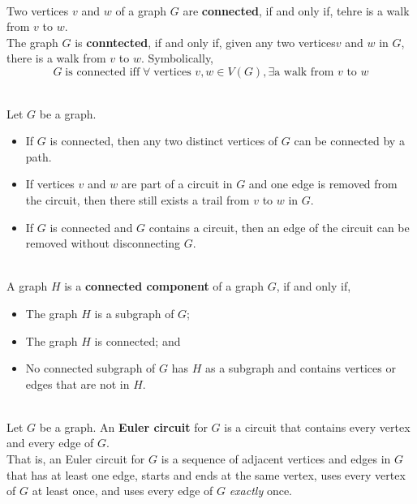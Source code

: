 \documentclass[12pt]{article}
\begin{document}
\begin{definition}[Connectedness]
\hfill\\
\normalfont Two vertices $v$ and $w$ of a graph $G$ are \textbf{connected}, if and only if, tehre is a walk from $v$ to $w$.\\
The graph $G$ is \textbf{conntected}, if and only if, given any two vertices$v$ and $w$ in $G$, there is a walk from $v$ to $w$. Symbolically,
\[
G\;\text{is connected iff} \;\forall \;\text{vertices }v,w \in V(G), \exists\text{a walk from }v\text{ to }w
\]
\end{definition}
\begin{lemma}[10.2.1]
\hfill\\
\normalfont Let $G$ be a graph.
\begin{itemize}
\item If $G$ is connected, then any two distinct vertices of $G$ can be connected by a path.
\item If vertices $v$ and $w$ are part of a circuit in $G$ and one edge is removed from the circuit, then there still exists a trail from $v$ to $w$ in $G$.
\item If $G$ is connected and $G$ contains a circuit, then an edge of the circuit can be removed without disconnecting $G$.
\end{itemize}
\end{lemma}
\begin{definition}
\hfill\\
\normalfont A graph $H$ is a \textbf{connected component} of a graph $G$, if and only if,
\begin{itemize}
\item The graph $H$ is a subgraph of $G$;
\item The graph $H$ is connected; and
\item No connected subgraph of $G$ has $H$ as a subgraph and contains vertices or edges that are not in $H$.
\end{itemize}
\end{definition}
\begin{definition}
\hfill\\
\normalfont Let $G$ be a graph. An \textbf{Euler circuit} for $G$ is a circuit that contains every vertex and every edge of $G$.\\
That is, an Euler circuit for $G$ is a sequence of adjacent vertices and edges in $G$ that has at least one edge, starts and ends at the same vertex, uses every vertex of $G$ at least once, and uses every edge of $G$ \textit{exactly} once.
\end{definition}
\end{document}
